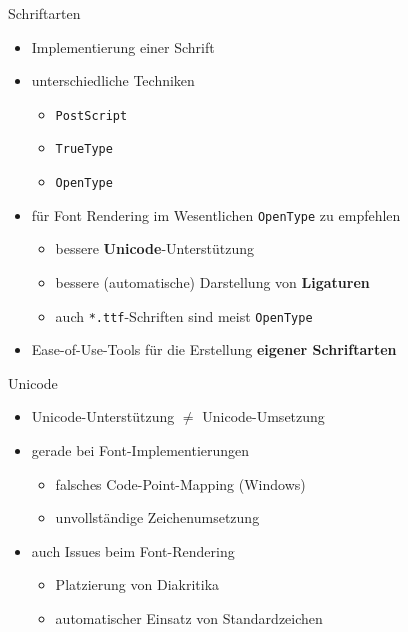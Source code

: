 \documentclass{bbawslides}
\begin{document}
\begin{bbawslide}{Schriftarten}
  \vspace*{7mm}%
  \centerslidestrue%
  \begin{itemize}
    \item Implementierung einer Schrift
    \item unterschiedliche Techniken
    \begin{itemize}\small
      \item \texttt{PostScript}
      \item \texttt{TrueType}
      \item \texttt{OpenType}
    \end{itemize}
    \item für Font Rendering im Wesentlichen \texttt{OpenType} zu empfehlen
    \begin{itemize}\small
      \item bessere \textbf{Unicode}-Unterstützung
      \item bessere (automatische) Darstellung von \textbf{Ligaturen}
      \item auch \texttt{*.ttf}-Schriften sind meist \texttt{OpenType}
    \end{itemize}
    \item Ease-of-Use-Tools für die Erstellung \textbf{eigener Schriftarten}
  \end{itemize}
\end{bbawslide}

\begin{bbawslide}{Unicode}
  \vspace*{7mm}%
  \centerslidestrue%
  \begin{itemize}
    \item Unicode-Unterstützung $\neq$ Unicode-Umsetzung
    \item gerade bei Font-Implementierungen
    \begin{itemize}\small
      \item falsches Code-Point-Mapping (Windows)
      \item unvollständige Zeichenumsetzung
    \end{itemize}
    \item auch Issues beim Font-Rendering
    \begin{itemize}\small
      \item Platzierung von Diakritika
      \item automatischer Einsatz von Standardzeichen
    \end{itemize}
  \end{itemize}
  \begin{center}
    \\[2ex]
  \end{center}
\end{bbawslide}
\end{document}
